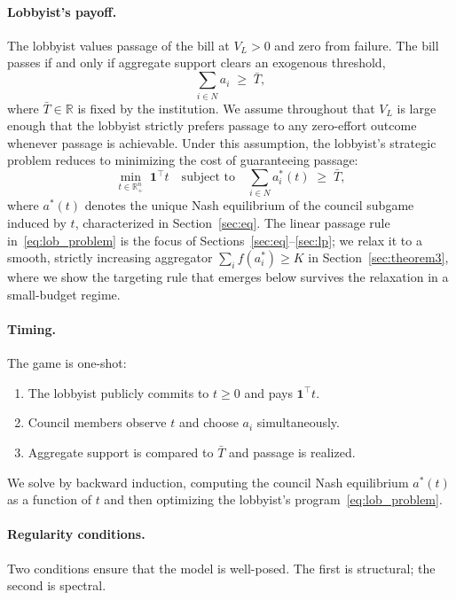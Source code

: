 \documentclass[11pt,letterpaper]{article}
\theoremstyle{plain}
\theoremstyle{definition}
\theoremstyle{remark}
\begin{document}
\paragraph{Lobbyist's payoff.} The lobbyist values passage of the bill at $V_L > 0$ and zero from failure. The bill passes if and only if aggregate support clears an exogenous threshold,
\[
\sum_{i \in N} a_i \;\geq\; \bar T,
\]
where $\bar T \in \mathbb{R}$ is fixed by the institution. We assume throughout that $V_L$ is large enough that the lobbyist strictly prefers passage to any zero-effort outcome whenever passage is achievable. Under this assumption, the lobbyist's strategic problem reduces to minimizing the cost of guaranteeing passage:
\begin{equation}
\min_{t \in \mathbb{R}^n_+} \; \mathbf{1}^\top t \quad \text{subject to} \quad \sum_{i \in N} a_i^*(t) \;\geq\; \bar T,
\label{eq:lob_problem}
\end{equation}
where $a^*(t)$ denotes the unique Nash equilibrium of the council subgame induced by $t$, characterized in Section~\ref{sec:eq}. The linear passage rule in~\eqref{eq:lob_problem} is the focus of Sections~\ref{sec:eq}--\ref{sec:lp}; we relax it to a smooth, strictly increasing aggregator $\sum_i f(a_i^*) \geq K$ in Section~\ref{sec:theorem3}, where we show the targeting rule that emerges below survives the relaxation in a small-budget regime.

\paragraph{Timing.} The game is one-shot:
\begin{enumerate}
\item[(i)] The lobbyist publicly commits to $t \geq 0$ and pays $\mathbf{1}^\top t$.
\item[(ii)] Council members observe $t$ and choose $a_i$ simultaneously.
\item[(iii)] Aggregate support is compared to $\bar T$ and passage is realized.
\end{enumerate}
We solve by backward induction, computing the council Nash equilibrium $a^*(t)$ as a function of $t$ and then optimizing the lobbyist's program~\eqref{eq:lob_problem}.

\paragraph{Regularity conditions.} Two conditions ensure that the model is well-posed. The first is structural; the second is spectral.
\end{document}
